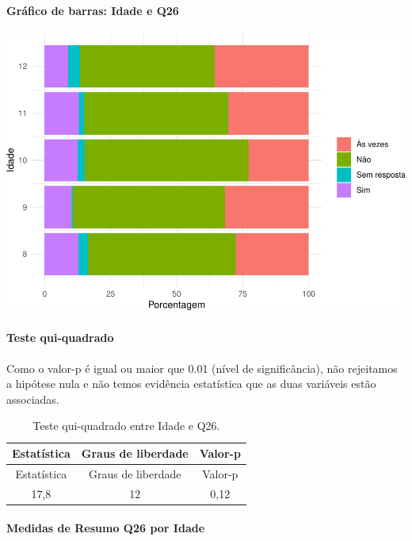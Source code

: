 \documentclass[]{article}
\let\oldparagraph\paragraph
\renewcommand{\paragraph}[1]{\oldparagraph{#1}\mbox{}}
\begin{document}
\hypertarget{gruxe1fico-de-barras-idade-e-q26}{%
\paragraph{Gráfico de barras: Idade e Q26}\label{gruxe1fico-de-barras-idade-e-q26}}

\begin{center}\includegraphics[width=0.75\linewidth]{relatorio_covid19_files/figure-latex/unnamed-chunk-741-1} \end{center}

\hypertarget{teste-qui-quadrado-64}{%
\paragraph{Teste qui-quadrado}\label{teste-qui-quadrado-64}}

Como o valor-p é igual ou maior que 0.01 (nível de significância), não rejeitamos a hipótese nula e não temos evidência estatística que as duas variáveis estão associadas.

\begin{longtable}[]{@{}ccc@{}}
\caption{\label{tab:unnamed-chunk-743}Teste qui-quadrado entre Idade e Q26.}\tabularnewline
\toprule
Estatística & Graus de liberdade & Valor-p\tabularnewline
\midrule
\endfirsthead
\toprule
Estatística & Graus de liberdade & Valor-p\tabularnewline
\midrule
\endhead
17,8 & 12 & 0,12\tabularnewline
\bottomrule
\end{longtable}

\cleardoublepage

\hypertarget{medidas-de-resumo-q26-por-idade}{%
\paragraph{Medidas de Resumo Q26 por Idade}\label{medidas-de-resumo-q26-por-idade}}
\end{document}

